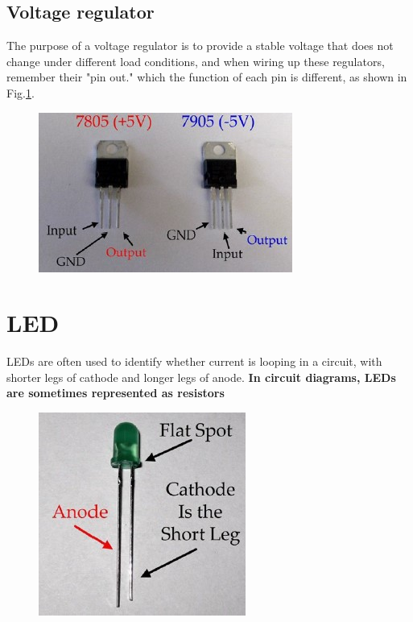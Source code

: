 \documentclass[a4paper, 12pt, AutoFakeBold]{report}
\newcommand{\figref}[1]{Fig.\ref{#1}}
\begin{document}
    \subsection{Voltage regulator}
    The purpose of a voltage regulator is to provide a stable voltage that does not change under different load conditions, and when wiring up these regulators, remember their "pin out." which the function of each pin is different, as shown in \figref{fig:1.3.1}.
    \begin{figure}[H]
        \centering
        \includegraphics[scale=1]{figs/Fig1-3-1.jpg}
        \caption{}
        \label{fig:1.3.1}
    \end{figure}

    \section{LED}
    LEDs are often used to identify whether current is looping in a circuit, with shorter legs of cathode and longer legs of anode. \textbf{In circuit diagrams, LEDs are sometimes represented as resistors}
    \begin{figure}[H]
        \centering
        \includegraphics[scale=1]{figs/Fig1-4.jpg}
        \caption{}
        \label{fig:1.4}
    \end{figure}
\end{document}
